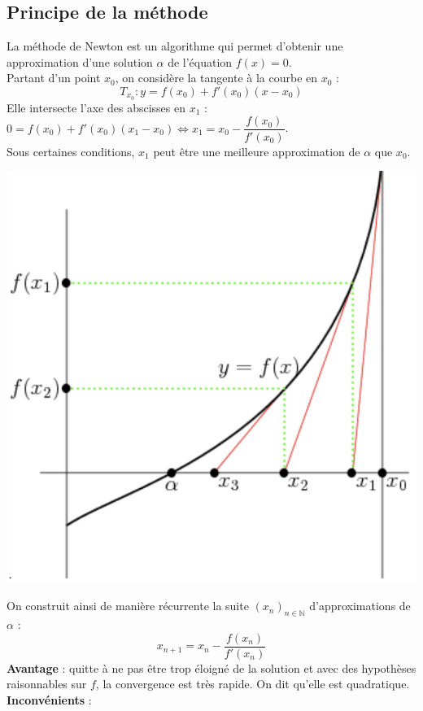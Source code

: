 \subsection{Principe de la m\' ethode}
\noindent La m\' ethode de Newton est un algorithme qui permet d'obtenir une approximation d'une solution $\alpha$ de l'\' equation $f(x)=0$.\\
Partant d'un point $x_0$, on consid\` ere la tangente \` a la courbe en $x_0$ :
\[T_{x_0}\colon y = f(x_0)+f'(x_0)(x-x_0)\]
Elle intersecte l'axe des abscisses en $x_1$ : $0=f(x_0)+f'(x_0)(x_1-x_0) \Leftrightarrow x_1=x_0-\dfrac{f(x_0)}{f'(x_0)}$.\\
Sous certaines conditions, $x_1$ peut \^ etre une meilleure approximation de $\alpha$ que $x_0$.
\begin{center}
\includegraphics[scale=0.5]{Dessin/Newton_convexe.pdf}
\end{center}
On construit ainsi de mani\` ere r\' ecurrente la suite $(x_n)_{n\in\mathbb{N}}$ d'approximations de $\alpha$ : 
\[x_{n+1}=x_n-\dfrac{f(x_n)}{f'(x_n)}\]
\textbf{Avantage }: quitte \` a ne pas \^ etre trop \' eloign\' e de la solution et avec des hypoth\` eses raisonnables sur $f$, la convergence est tr\` es rapide. On dit qu'elle est quadratique.\\
\textbf{Inconv\' enients }:
